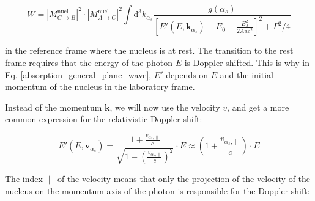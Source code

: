 \documentclass{article}
\begin{document}
\begin{equation}
\label{absorption_general_plane_wave}
	W = \left| M^{\mathrm{nucl}}_{C \to B} \right|^2 \cdot \left| M^{\mathrm{nucl}}_{A \to C} \right|^2 \int \mathrm{d}^3 k_{\alpha_s}  \frac{g(\alpha_s)}{ \left[ E' (E, \mathbf{k}_{\alpha_s})- E_0 - \frac{E_0^2}{2 Auc^2} \right]^2 + \Gamma^2 / 4}
\end{equation}

in the reference frame where the nucleus is at rest. 
The transition to the rest frame requires that the energy of the photon $E$ is Doppler-shifted.
This is why in Eq. \ref{absorption_general_plane_wave}, $E'$ depends on $E$ and the initial momentum of the nucleus in the laboratory frame.

%

Instead of the momentum $\mathbf{k}$, we will now use the velocity $v$, and get a more common expression for the relativistic Doppler shift:


\begin{equation}
	\label{doppler_shifted_transition_energy}
	E' (E, \mathbf{v}_{\alpha_s}) = \frac{1 + \frac{v_{\alpha_s, \parallel}}{c}}{\sqrt{1 - \left( \frac{v_{\alpha_s, \parallel}}{c} \right)^2}} \cdot E \approx \left( 1 + \frac{v_{\alpha_s, \parallel}}{c} \right) \cdot E
\end{equation}

The index $\parallel$ of the velocity means that only the projection of the velocity of the nucleus on the momentum axis of the photon is responsible for the Doppler shift:
\end{document}
